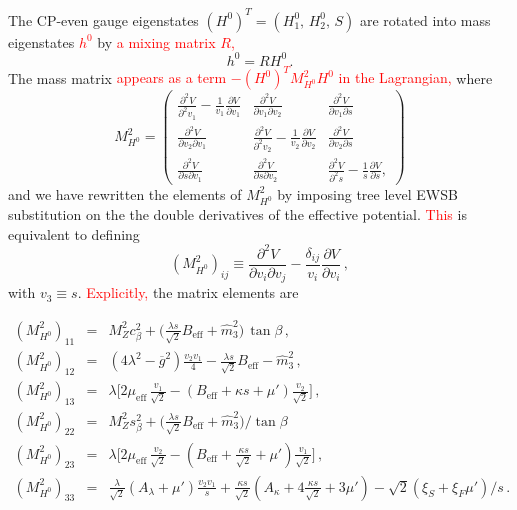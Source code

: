 \documentclass[final,3p,times,pdflatex]{elsarticle}
\newcommand{\be}{\begin{equation}}
\newcommand{\ee}{\end{equation}}
\newcommand{\ba}{\begin{eqnarray}}
\newcommand{\ea}{\end{eqnarray}}
\newcommand{\ds}{\displaystyle}
\newcommand*{\red}[1]{\textcolor{red}{#1}}
\begin{document}
The CP-even gauge eigenstates $(H^0)^T = (H_1^0,\, H_2^0, \, S)$ are rotated into mass eigenstates \red{$h^0$} %
 by \red{a mixing matrix $R$,} %
\be h^0 = R H^0\,. 
\ee 
%
The mass matrix \red{appears as a term $-(H^0)^T M^2_{H^0} H^0$ in the Lagrangian,} %
where
\be
M_{H^0}^2=
\left(
\begin{array}{ccc}
\ds\frac{\partial^2 V}{\partial^2 v_1 } - \ds\frac{1}{v_1}\frac{\partial V}{\partial v_1}&
\ds\frac{\partial^2 V}{\partial v_1 \partial v_2}&
\ds\frac{\partial^2 V}{\partial v_1 \partial s}\\[0.3cm]
\ds\frac{\partial^2 V}{\partial v_2 \partial v_1}&
\ds\frac{\partial^2 V}{\partial^2 v_2} - \ds\frac{1}{v_2}\frac{\partial V}{\partial v_2}&
\ds\frac{\partial^2 V}{\partial v_2 \partial s}\\[0.3cm]
\ds\frac{\partial^2 V}{\partial s \partial v_1}&
\ds\frac{\partial^2 V}{\partial s \partial v_2}&
\ds\frac{\partial^2 V}{\partial^2 s} - \ds\frac{1}{s}\frac{\partial V}{\partial s},
\end{array} 
\right)
 \ee 
and we have rewritten the elements of $M_{H^0}^2$ by imposing tree level EWSB substitution on the the double derivatives of the effective potential.  \red{This} %
is equivalent to defining  \be(M_{H^0}^2)_{ij} \equiv  \ds\frac{\partial^2 V}{\partial v_i \partial v_j} - \ds\frac{\delta_{ij}}{v_i}\ds\frac{\partial V}{\partial v_i}\,, \ee with $v_3 \equiv s$.  \red{Explicitly,} the matrix elements are  

\ba
 (M_{H^0}^2)_{11} & = & M_Z^2 c_\beta^2 + \Bigg(\ds\frac{\lambda s}{\sqrt{2}} B_\textrm{eff} +
\widehat{m}_3^2\Bigg)\,\tan\beta\,,\\
 (M_{H^0}^2)_{12} & = & (4\lambda^2 - \overline{g}^2) \ds\frac{v_2 v_1 }{4}- 
\ds\frac{\lambda s}{\sqrt{2}} B_\textrm{eff} - \widehat{m}_3^2\,, \\ 
 (M_{H^0}^2)_{13} & = & \lambda \Bigg[2 \mu_\textrm{eff}\,\ds\frac{ v_1}{\sqrt{2}} -
(B_\textrm{eff} + \kappa s + \mu')\ds\frac{ v_2}{\sqrt{2}}\Bigg]\,,\\
 (M_{H^0}^2)_{22} & = & M_Z^2 s_\beta^2 + \Bigg(\ds\frac{\lambda s}{\sqrt{2}} B_\textrm{eff} +
\widehat{m}_3^2\Bigg)/\tan\beta\, \\
 (M_{H^0}^2)_{23} & = & \lambda \Bigg[2 \mu_\textrm{eff}\, \ds\frac{ v_2}{\sqrt{2}} -
(B_\textrm{eff} + \frac{\kappa s}{\sqrt{2}} + \mu')\ds\frac{ v_1}{\sqrt{2}}\Bigg]\,, \\
 (M_{H^0}^2)_{33} & = & \ds\frac{\lambda}{\sqrt{2}} (A_\lambda + \mu') \frac{v_2 v_1}{s}
+ \frac{\kappa s}{\sqrt{2}} (A_\kappa + 4\frac{\kappa s}{\sqrt{2}}+ 3 \mu') - \sqrt{2}(\xi_S + \xi_F \mu')/s\,.
\label{eq:MH0}
\ea
\end{document}
